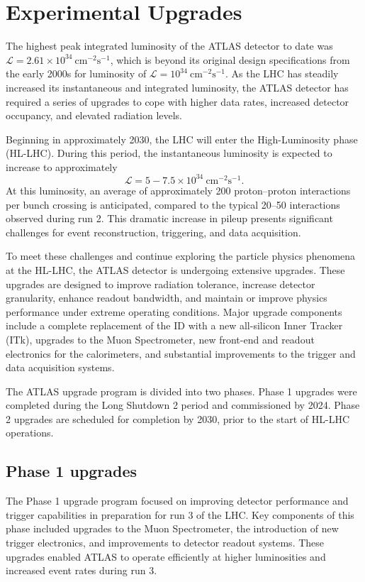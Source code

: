 \chapter{Experimental Upgrades}


The highest peak integrated luminosity of the ATLAS detector to date was $\mathcal{L} = 2.61 \times 10^{34}~\mathrm{cm}^{-2}\mathrm{s}^{-1}$, which is beyond its original design specifications from the early 2000s for luminosity of 
$\mathcal{L} = 10^{34}~\mathrm{cm}^{-2}\mathrm{s}^{-1}$.
As the LHC has steadily increased its instantaneous and integrated luminosity, the ATLAS detector has required a series of upgrades to cope with higher data rates, increased detector occupancy, and elevated radiation levels.

Beginning in approximately 2030, the LHC will enter the High-Luminosity phase (HL-LHC). 
During this period, the instantaneous luminosity is expected to increase to approximately
\[
\mathcal{L} = 5 - 7.5 \times 10^{34}~\mathrm{cm}^{-2}\mathrm{s}^{-1}.
\]
At this luminosity, an average of approximately 200 proton--proton interactions per bunch crossing is anticipated, compared to the typical 20--50 interactions observed during run 2. 
This dramatic increase in pileup presents significant challenges for event reconstruction, triggering, and data acquisition.

To meet these challenges and continue exploring the particle physics phenomena at the HL-LHC, the ATLAS detector is undergoing extensive upgrades. 
These upgrades are designed to improve radiation tolerance, increase detector granularity, enhance readout bandwidth, and maintain or improve physics performance under extreme operating conditions. 
Major upgrade components include a complete replacement of the ID with a new all-silicon Inner Tracker (ITk), upgrades to the Muon Spectrometer, new front-end and readout electronics for the calorimeters, and substantial improvements to the trigger and data acquisition systems.

The ATLAS upgrade program is divided into two phases. 
Phase 1 upgrades were completed during the Long Shutdown 2 period and commissioned by 2024. 
Phase 2 upgrades are scheduled for completion by 2030, prior to the start of HL-LHC operations.



\section{Phase 1 upgrades}
The Phase 1 upgrade program focused on improving detector performance and trigger capabilities in preparation for run 3 of the LHC. 
Key components of this phase included upgrades to the Muon Spectrometer, the introduction of new trigger electronics, and improvements to detector readout systems. 
These upgrades enabled ATLAS to operate efficiently at higher luminosities and increased event rates during run 3.



